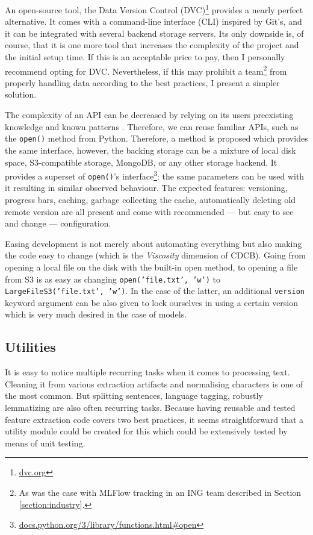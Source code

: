 An open-source tool, the Data Version Control (DVC)\footnote{\href{https://dvc.org/}{dvc.org}} provides a nearly perfect alternative. It comes with a command-line interface (CLI) inspired by Git's, and it can be integrated with several backend storage servers. Its only downside is, of course, that it is one more tool that increases the complexity of the project and the initial setup time. If this is an acceptable price to pay, then I personally recommend opting for DVC. Nevertheless, if this may prohibit a team\footnote{As was the case with MLFlow tracking in an ING team described in Section \ref{section:industry}.} from properly handling data according to the best practices, I present a simpler solution.

The complexity of an API can be decreased by relying on its users preexisting knowledge and known patterns \cite{hermans2021programmer,ousterhout2018philosophy}. Therefore, we can reuse familiar APIs, such as the \texttt{open()} method from Python. Therefore, a method is proposed which provides the same interface, however, the backing storage can be a mixture of local disk space, S3-compatible storage, MongoDB, or any other storage backend. It provides a superset of \texttt{open()}'s interface\footnote{\href{https://docs.python.org/3/library/functions.html\#open}{docs.python.org/3/library/functions.html\#open}}: the same parameters can be used with it resulting in similar observed behaviour. The expected features: versioning, progress bars, caching, garbage collecting the cache, automatically deleting old remote version are all present and come with recommended --- but easy to see and change --- configuration.

Easing development is not merely about automating everything but also making the code easy to change (which is the \textit{Viscosity} dimension of CDCB). Going from opening a local file on the disk with the built-in open method, to opening a file from S3 is as easy as changing \texttt{open('file.txt', 'w')} to \texttt{LargeFileS3('file.txt', 'w')}. In the case of the latter, an additional \texttt{version} keyword argument can be also given to lock ourselves in using a certain version which is very much desired in the case of models.

\subsection{Utilities}

It is easy to notice multiple recurring tasks when it comes to processing text. Cleaning it from various extraction artifacts and normalising characters is one of the most common. But splitting sentences, language tagging, robustly lemmatizing are also often recurring tasks. Because having reusable and tested feature extraction code covers two best practices, it seems straightforward that a utility module could be created for this which could be extensively tested by means of unit testing.

